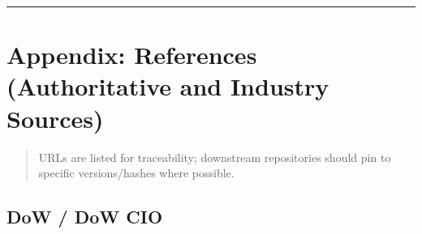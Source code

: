 \documentclass[11pt]{article}
\begin{document}
\vspace{2pt}\begin{center}\rule{0.62\linewidth}{0.6pt}\end{center}\vspace{2pt}

\hypertarget{appendix-references-authoritative-and-industry-sources}{%
\section{Appendix: References (Authoritative and Industry Sources)}\label{appendix-references-authoritative-and-industry-sources}}

\begin{quote}
URLs are listed for traceability; downstream repositories should pin to
specific versions/hashes where possible.
\end{quote}

\hypertarget{dow-dow-cio}{%
\subsection{DoW / DoW CIO}\label{dow-dow-cio}}
\end{document}
